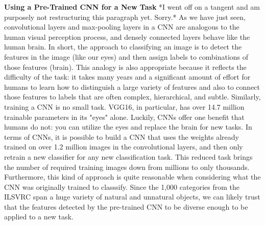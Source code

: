 \documentclass{article}\usepackage[]{graphicx}\usepackage[]{color}
\begin{document}
\textbf{Using a Pre-Trained CNN for a New Task}
*I went off on a tangent and am purposely not restructuring this paragraph yet. Sorry.*
As we have just seen, convolutional layers and max-pooling layers in a CNN are analogous to the human visual perception process, and densely connected layers behave like the human brain. In short, the approach to classifying an image is to detect the features in the image (like our eyes) and then assign labels to combinations of those features (brain). This analogy is also appropriate because it reflects the difficulty of the task: it takes many years and a significant amount of effort for humans to learn how to distinguish a large variety of features and also to connect those features to labels that are often complex, hierarchical, and subtle. Similarly, training a CNN is no small task. VGG16, in particular, has over 14.7 million trainable parameters in its "eyes" alone. Luckily, CNNs offer one benefit that humans do not: you can utilize the eyes and replace the brain for new tasks. In terms of CNNs, it is possible to build a CNN that uses the weights already trained on over 1.2 million images in the convolutional layers, and then only retrain a new classifier for any new classification task. This reduced task brings the number of required training images down from millions to only thousands. Furthermore, this kind of approach is quite reasonable when considering what the CNN was originally trained to classsify. Since the 1,000 categories from the ILSVRC span a huge variety of natural and unnatural objects, we can likely trust that the features detected by the pre-trained CNN to be diverse enough to be applied to a new task.
\end{document}
